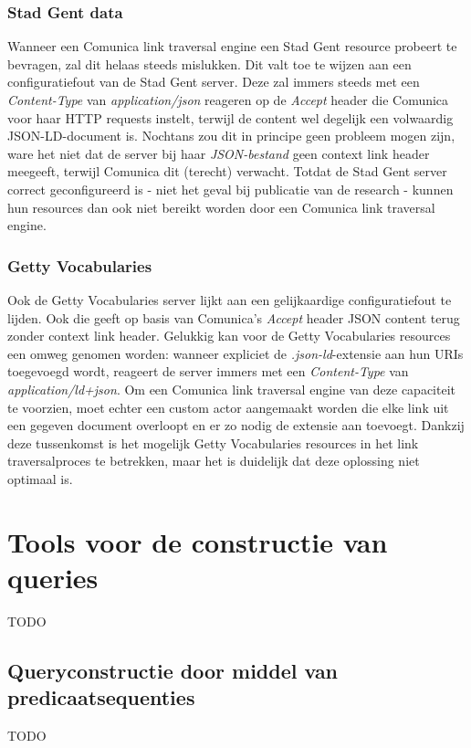 \documentclass[conference]{IEEEtran}
\begin{document}
\subsubsection{Stad Gent data}
Wanneer een Comunica link traversal engine een Stad Gent resource probeert te bevragen, zal dit helaas steeds mislukken. Dit valt toe te wijzen aan een configuratiefout van de Stad Gent server. Deze zal immers steeds met een \textit{Content-Type} van \textit{application/json} reageren op de \textit{Accept} header die Comunica voor haar HTTP requests instelt, terwijl de content wel degelijk een volwaardig JSON-LD-document is. Nochtans zou dit in principe geen probleem mogen zijn, ware het niet dat de server bij haar \textit{JSON-bestand} geen context link header meegeeft, terwijl Comunica dit (terecht) verwacht. Totdat de Stad Gent server correct geconfigureerd is - niet het geval bij publicatie van de research - kunnen hun resources dan ook niet bereikt worden door een Comunica link traversal engine.

\subsubsection{Getty Vocabularies}
Ook de Getty Vocabularies server lijkt aan een gelijkaardige configuratiefout te lijden. Ook die geeft op basis van Comunica's \textit{Accept} header JSON content terug zonder context link header. Gelukkig kan voor de Getty Vocabularies resources een omweg genomen worden: wanneer expliciet de \textit{.json-ld}-extensie aan hun URIs toegevoegd wordt, reageert de server immers met een \textit{Content-Type} van \textit{application/ld+json}. Om een Comunica link traversal engine van deze capaciteit te voorzien, moet echter een custom actor aangemaakt worden die elke link uit een gegeven document overloopt en er zo nodig de extensie aan toevoegt. Dankzij deze tussenkomst is het mogelijk Getty Vocabularies resources in het link traversalproces te betrekken, maar het is duidelijk dat deze oplossing niet optimaal is.

\section{Tools voor de constructie van queries}
TODO

\subsection{Queryconstructie door middel van predicaatsequenties}
TODO
\end{document}
